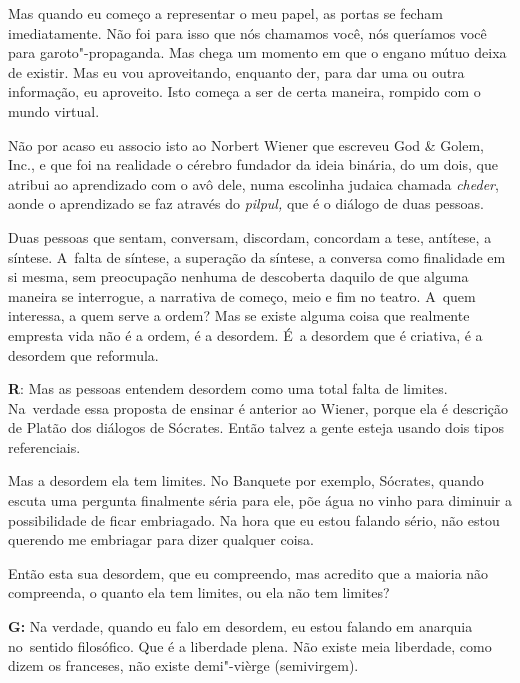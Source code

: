  

Mas quando eu começo a representar o meu papel, as portas se fecham
imediatamente. Não foi para isso que nós chamamos você, nós queríamos
você para garoto"-propaganda. Mas chega um momento em que o engano mútuo
deixa de existir. Mas eu vou aproveitando, enquanto der, para dar uma ou
outra informação, eu aproveito. Isto começa a ser de certa maneira,
rompido com o mundo virtual.

 

Não por acaso eu associo isto ao Norbert Wiener que escreveu God \&
Golem, Inc., e que foi na realidade o cérebro fundador da ideia binária,
do um dois, que atribui ao aprendizado com o avô dele, numa escolinha
judaica chamada \emph{cheder}, aonde o aprendizado se faz através do
\emph{pilpul,} que é o diálogo de duas pessoas.

 

Duas pessoas que sentam, conversam, discordam, concordam a tese,
antítese, a síntese. A~falta de síntese, a superação da síntese, a
conversa como finalidade em si mesma, sem preocupação nenhuma de
descoberta daquilo de que alguma maneira se interrogue, a narrativa de
começo, meio e fim no teatro. A~quem interessa, a quem serve a ordem?
Mas se existe alguma coisa que realmente empresta vida não é a ordem, é
a desordem. É~a desordem que é criativa, é a desordem que reformula.

 

\textbf{R}: Mas as pessoas entendem desordem como uma total falta de
limites. Na\textbf{}~verdade essa proposta de ensinar é anterior ao
Wiener, porque ela é descrição de Platão dos diálogos de Sócrates. Então
talvez a gente esteja usando dois tipos referenciais.

 

Mas a desordem ela tem limites. No Banquete por exemplo, Sócrates,
quando escuta uma pergunta finalmente séria para ele, põe água no vinho
para diminuir a possibilidade de ficar embriagado. Na hora que eu estou
falando sério, não estou querendo me embriagar para dizer qualquer
coisa.

 

Então esta sua desordem, que eu compreendo, mas acredito que a maioria
não compreenda, o quanto ela tem limites, ou ela não tem limites?

 

\textbf{G:} Na verdade, quando eu falo em desordem, eu estou falando em
anarquia no\textbf{}~sentido filosófico. Que é a liberdade plena. Não
existe meia liberdade, como dizem os franceses, não existe demi"-vièrge
(semivirgem).

